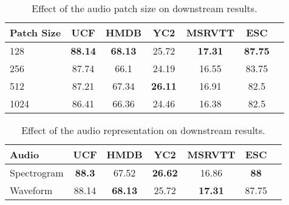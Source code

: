 \documentclass[10pt,twocolumn,letterpaper]{article}
\begin{document}
\begin{table}[h!]
    \small
    \centering
    \setlength{\tabcolsep}{3pt}
    \begin{tabular}{@{}lcccccc@{}}
    \toprule
    Patch Size & UCF & HMDB & YC2 & MSRVTT & ESC \\
    \midrule
    128 & \textbf{88.14} & \textbf{68.13} & 25.72 & \textbf{17.31} & \textbf{87.75} \\
    256 & 87.74 & 66.1 & 24.19 & 16.55 & 83.75 \\
    512 & 87.21 & 67.34 & \textbf{26.11} & 16.91 & 82.5 \\
    1024 & 86.41 & 66.36 & 24.46 & 16.38 & 82.5 \\
    \bottomrule
    \end{tabular}
    \vspace{2mm}
    \caption{Effect of the audio patch size on downstream results.}
    \label{table:autio_patch}
    \vspace{-2mm}
\end{table} \begin{table}[h!]
    \small
    \centering
    \setlength{\tabcolsep}{3pt}
    \begin{tabular}{@{}lcccccc@{}}
    \toprule
    Audio & UCF & HMDB & YC2 & MSRVTT & ESC \\
    \midrule
    Spectrogram & \textbf{88.3} & 67.52 & \textbf{26.62} & 16.86 & \textbf{88} \\
    Waveform & 88.14 & \textbf{68.13} & 25.72 & \textbf{17.31} & 87.75 \\
    \bottomrule
    \end{tabular}
    \vspace{2mm}
    \caption{Effect of the audio representation on downstream results.}
    \label{table:wave_spec}
    \vspace{-2mm}
\end{table} 
\end{document}
